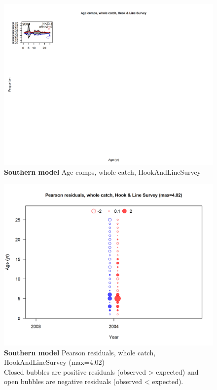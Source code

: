 \documentclass[12pt,]{article}
\begin{document}
\begin{figure}[htbp]
\centering
\includegraphics{./r4ss/plots_mod2/comp_agefit_flt4mkt0.png}
\caption{\textbf{Southern model} Age comps, whole catch,
HookAndLineSurvey \label{fig:mod2_5_comp_agefit_flt4mkt0}}
\end{figure}

\begin{figure}[htbp]
\centering
\includegraphics{./r4ss/plots_mod2/comp_agefit_residsflt4mkt0.png}
\caption{\textbf{Southern model} Pearson residuals, whole catch,
HookAndLineSurvey (max=4.02)\\
Closed bubbles are positive residuals (observed \textgreater{} expected)
and open bubbles are negative residuals (observed \textless{} expected).
\label{fig:mod2_6_comp_agefit_residsflt4mkt0}}
\end{figure}
\end{document}
